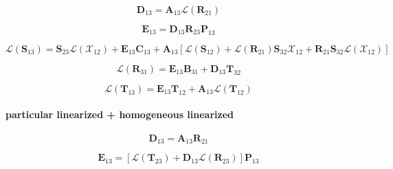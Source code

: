 \begin{equation}
\mathbf{D}_{13} = \mathbf{A}_{13}\mathcal{L}(\mathbf{R}_{21})
\label{eq:adding-downward-tangent_linear-homogeneous_linearized_p_unlinearized-D13}
\end{equation}

\begin{equation}
\mathbf{E}_{13} = \mathbf{D}_{13}\mathbf{R}_{23}\mathbf{P}_{13}
\label{eq:adding-downward-tangent_linear-homogeneous_linearized_p_unlinearized-E13}
\end{equation}

\begin{equation}
\mathcal{L}(\mathbf{S}_{13}) = \mathbf{S}_{23}\mathcal{L}(\mathcal{X}_{12}) + \mathbf{E}_{13}\mathbf{C}_{13} + \mathbf{A}_{13}\left[\mathcal{L}(\mathbf{S}_{12}) + \mathcal{L}(\mathbf{R}_{21})\mathbf{S}_{32}\mathcal{X}_{12} + \mathbf{R}_{21}\mathbf{S}_{32}\mathcal{L}(\mathcal{X}_{12})\right]
\label{eq:adding-downward-tangent_linear-homogeneous_linearized_p_unlinearized-V13}
\end{equation}

\begin{equation}
\mathcal{L}(\mathbf{R}_{31}) = \mathbf{E}_{13}\mathbf{B}_{31} + \mathbf{D}_{13}\mathbf{T}_{32}
\label{eq:adding-downward-tangent_linear-homogeneous_linearized_p_unlinearized-U31}
\end{equation}

\begin{equation}
\mathcal{L}(\mathbf{T}_{13}) = \mathbf{E}_{13}\mathbf{T}_{12} + \mathbf{A}_{13}\mathcal{L}(\mathbf{T}_{12})
\label{eq:adding-downward-tangent_linear-homogeneous_linearized_p_unlinearized-W13}
\end{equation}


\paragraph{particular linearized + homogeneous linearized}
\label{sec:adding-downward-tangent_linear-particular_linearized_p_homogeneous_linearized}

\begin{equation}
\mathbf{D}_{13} = \mathbf{A}_{13}\mathbf{R}_{21}
\label{eq:adding-downward-tangent_linear-particular_linearized_p_homogeneous_linearized-D13}
\end{equation}

\begin{equation}
\mathbf{E}_{13} = \left[\mathcal{L}(\mathbf{T}_{23}) + \mathbf{D}_{13}\mathcal{L}(\mathbf{R}_{23})\right]\mathbf{P}_{13}
\label{eq:adding-downward-tangent_linear-particular_linearized_p_homogeneous_linearized-E13}
\end{equation}

